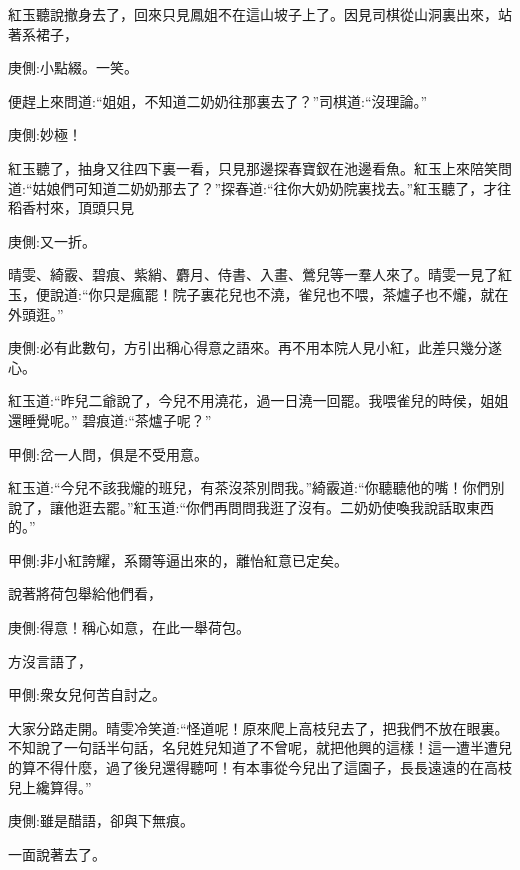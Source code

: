 \begin{parag}
    紅玉聽說撤身去了，回來只見鳳姐不在這山坡子上了。因見司棋從山洞裏出來，站著系裙子，\begin{note}庚側:小點綴。一笑。\end{note}便趕上來問道:“姐姐，不知道二奶奶往那裏去了？”司棋道:“沒理論。”\begin{note}庚側:妙極！\end{note}紅玉聽了，抽身又往四下裏一看，只見那邊探春寶釵在池邊看魚。紅玉上來陪笑問道:“姑娘們可知道二奶奶那去了？”探春道:“往你大奶奶院裏找去。”紅玉聽了，才往稻香村來，頂頭只見\begin{note}庚側:又一折。\end{note} 晴雯、綺霰、碧痕、紫綃、麝月、侍書、入畫、鶯兒等一羣人來了。晴雯一見了紅玉，便說道:“你只是瘋罷！院子裏花兒也不澆，雀兒也不喂，茶爐子也不爖，就在外頭逛。”\begin{note}庚側:必有此數句，方引出稱心得意之語來。再不用本院人見小紅，此差只幾分遂心。\end{note} 紅玉道:“昨兒二爺說了，今兒不用澆花，過一日澆一回罷。我喂雀兒的時侯，姐姐還睡覺呢。” 碧痕道:“茶爐子呢？”\begin{note}甲側:岔一人問，俱是不受用意。\end{note}紅玉道:“今兒不該我爖的班兒，有茶沒茶別問我。”綺霰道:“你聽聽他的嘴！你們別說了，讓他逛去罷。”紅玉道:“你們再問問我逛了沒有。二奶奶使喚我說話取東西的。”\begin{note}甲側:非小紅誇耀，系爾等逼出來的，離怡紅意已定矣。\end{note}說著將荷包舉給他們看，\begin{note}庚側:得意！稱心如意，在此一舉荷包。\end{note}方沒言語了， \begin{note}甲側:衆女兒何苦自討之。\end{note}大家分路走開。晴雯冷笑道:“怪道呢！原來爬上高枝兒去了，把我們不放在眼裏。不知說了一句話半句話，名兒姓兒知道了不曾呢，就把他興的這樣！這一遭半遭兒的算不得什麼，過了後兒還得聽呵！有本事從今兒出了這園子，長長遠遠的在高枝兒上纔算得。”\begin{note}庚側:雖是醋語，卻與下無痕。\end{note}一面說著去了。
\end{parag}


